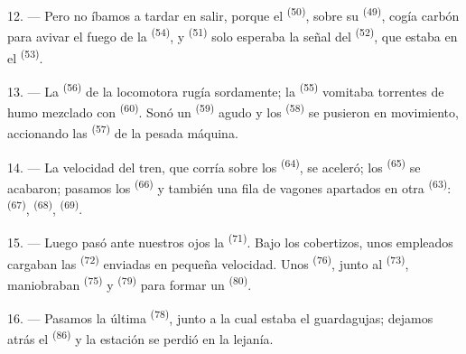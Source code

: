 12. --- Pero no íbamos a tardar en salir, porque el 
\textsuperscript{(50)}, sobre su  \textsuperscript{(49)}, cogía carbón para
avivar el fuego de la  \textsuperscript{(54)}, y  \textsuperscript{(51)} solo esperaba la señal del  \textsuperscript{(52)}, que estaba en el  \textsuperscript{(53)}.

13. --- La  \textsuperscript{(56)} de la locomotora rugía sordamente;
la  \textsuperscript{(55)} vomitaba torrentes de humo mezclado con
 \textsuperscript{(60)}. Sonó un  \textsuperscript{(59)} agudo y
los  \textsuperscript{(58)} se pusieron en movimiento, accionando las
 \textsuperscript{(57)} de la pesada máquina.

\VUsaut{3.0mm}
\VUsaut{3.0mm}

14. --- La velocidad del tren, que corría sobre los 
\textsuperscript{(64)}, se aceleró; los  \textsuperscript{(65)} se acabaron;
pasamos los  \textsuperscript{(66)} y también una fila de vagones
apartados en otra  \textsuperscript{(63)}: 
\textsuperscript{(67)},  \textsuperscript{(68)}, 
\textsuperscript{(69)}.


15. --- Luego pasó ante nuestros ojos la 
\textsuperscript{(71)}. Bajo los cobertizos, unos empleados cargaban las
 \textsuperscript{(72)} enviadas en pequeña velocidad. Unos
 \textsuperscript{(76)}, junto al 
\textsuperscript{(73)}, maniobraban  \textsuperscript{(75)} y
 \textsuperscript{(79)} para formar un  \textsuperscript{(80)}.

16. --- Pasamos la última  \textsuperscript{(78)}, junto a la cual
estaba el guardagujas; dejamos atrás el 
\textsuperscript{(86)} y la estación se perdió en la lejanía.

